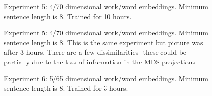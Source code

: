 \documentclass{article}%
\begin{document}
\begin{figure}
\noindent{}
\caption{Experiment 5: 4/70 dimensional work/word embeddings.  Minimum sentence length is 8. Trained for 10 hours. }
\end{figure}
\begin{figure}
\noindent{}
\caption{Experiment 5: 4/70 dimensional work/word embeddings.  Minimum sentence length is 8. This is the same experiment but picture was after 3 hours.   There are a few dissimilarities- these could be partially due to the loss of information in the MDS projections.  }
\end{figure}



\bigskip

\begin{figure}
\noindent{}
\caption{Experiment 6: 5/65 dimensional work/word embeddings.  Minimum sentence length is 8. Trained for 3 hours.}
\end{figure}
\end{document}
